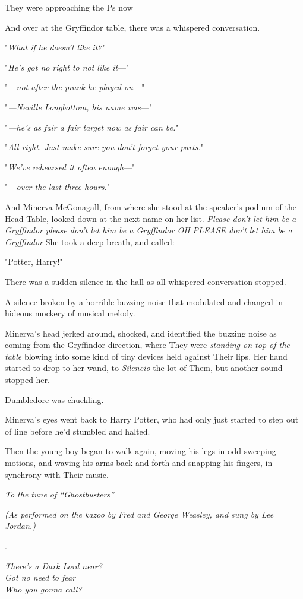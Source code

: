 They were approaching the Ps now{\el}

And over at the Gryffindor table, there was a whispered conversation.

"\emph{What if he doesn't like it?}"

"\emph{He's got no right to not like it}---"

"\emph{---not after the prank he played on}---"

"\emph{---Neville Longbottom, his name was}---"

"\emph{---he's as fair a fair target now as fair can be.}"

"\emph{All right. Just make sure you don't forget your parts.}"

"\emph{We've rehearsed it often enough}---"

"\emph{---over the last three hours.}"

And Minerva McGonagall, from where she stood at the speaker's podium of the
Head Table, looked down at the next name on her list. \emph{Please don't let
him be a Gryffindor please don't let him be a Gryffindor OH PLEASE don't let
him be a Gryffindor{\el}} She took a deep breath, and called:

"Potter, Harry!"

There was a sudden silence in the hall as all whispered conversation stopped.

A silence broken by a horrible buzzing noise that modulated and changed in
hideous mockery of musical melody.

Minerva's head jerked around, shocked, and identified the buzzing noise as
coming from the Gryffindor direction, where They were \emph{standing on top of
the table} blowing into some kind of tiny devices held against Their lips. Her
hand started to drop to her wand, to \emph{Silencio} the lot of Them, but
another sound stopped her.

Dumbledore was chuckling.

Minerva's eyes went back to Harry Potter, who had only just started to step out
of line before he'd stumbled and halted.

Then the young boy began to walk again, moving his legs in odd sweeping
motions, and waving his arms back and forth and snapping his fingers, in
synchrony with Their music.

\begin{center}
\emph{To the tune of ``Ghostbusters''}

\emph{(As performed on the kazoo by Fred and George Weasley,
and sung by Lee Jordan.)}

.

\emph{There's a Dark Lord near?\\
Got no need to fear\\
Who you gonna call?}
\end{center}

